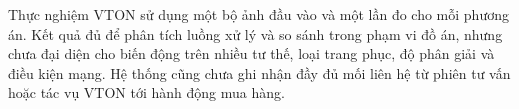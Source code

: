 \medskip

Thực nghiệm VTON sử dụng một bộ ảnh đầu vào và một lần đo cho mỗi phương án. Kết quả đủ để phân tích luồng xử lý và so sánh trong phạm vi đồ án, nhưng chưa đại diện cho biến động trên nhiều tư thế, loại trang phục, độ phân giải và điều kiện mạng. Hệ thống cũng chưa ghi nhận đầy đủ mối liên hệ từ phiên tư vấn hoặc tác vụ VTON tới hành động mua hàng.

\clearpage
